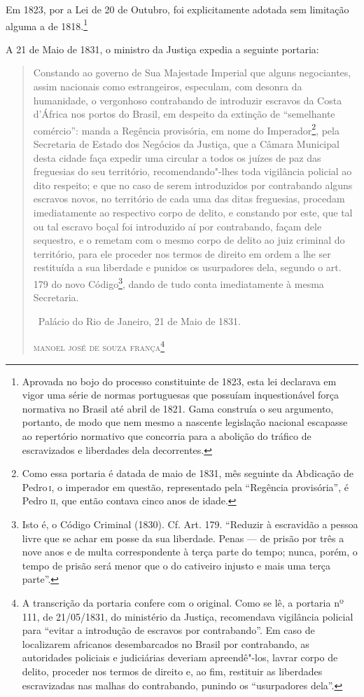 Em 1823, por a Lei de 20 de Outubro, foi explicitamente adotada sem
limitação alguma a de 1818.\footnote{Aprovada no bojo do processo
  constituinte de 1823, esta lei declarava em vigor uma série de normas
  portuguesas que possuíam inquestionável força normativa no Brasil até
  abril de 1821. Gama construía o seu argumento, portanto, de modo que
  nem mesmo a nascente legislação nacional escapasse ao repertório
  normativo que concorria para a abolição do tráfico de escravizados e
  liberdades dela decorrentes.}

A 21 de Maio de 1831, o ministro da Justiça expedia a seguinte portaria:

\begin{quote}
Constando ao governo de Sua Majestade Imperial que alguns negociantes,
assim nacionais como estrangeiros, especulam, com desonra da humanidade,
o vergonhoso contrabando de introduzir escravos da Costa d'África nos
portos do Brasil, em despeito da extinção de ``semelhante comércio'':
manda a Regência provisória, em nome do Imperador\footnote{Como essa
  portaria é datada de maio de 1831, mês seguinte da Abdicação de Pedro\,\textsc{i}, o imperador em questão, representado pela ``Regência provisória'', é
  Pedro \textsc{ii}, que então contava cinco anos de idade.}, pela Secretaria de
Estado dos Negócios da Justiça, que a Câmara Municipal desta cidade faça
expedir uma circular a todos os juízes de paz das freguesias do seu
território, recomendando"-lhes toda vigilância policial ao dito respeito;
e que no caso de serem introduzidos por contrabando alguns escravos
novos, no território de cada uma das ditas freguesias, procedam
imediatamente ao respectivo corpo de delito, e constando por este, que
tal ou tal escravo boçal foi introduzido aí por contrabando, façam dele
sequestro, e o remetam com o mesmo corpo de delito ao juiz criminal do
território, para ele proceder nos termos de direito em ordem a lhe ser
restituída a sua liberdade e punidos os usurpadores dela, segundo o art.
179 do novo Código\footnote{Isto é, o Código Criminal (1830). Cf. Art.
  179. ``Reduzir à escravidão a pessoa livre que se achar em posse da sua
  liberdade. Penas --- de prisão por três a nove anos e de multa
  correspondente à terça parte do tempo; nunca, porém, o tempo de prisão
  será menor que o do cativeiro injusto e mais uma terça parte''.}, dando
de tudo conta imediatamente à mesma Secretaria.

\bigskip

\hfill\ Palácio do Rio de Janeiro, 21 de Maio de 1831.\smallskip

\hfill\textsc{manoel josé de souza frança}\footnote{A transcrição da portaria
  confere com o original. Como se lê, a portaria nº 111, de 21/05/1831,
  do ministério da Justiça, recomendava vigilância policial para ``evitar
  a introdução de escravos por contrabando''. Em caso de localizarem
  africanos desembarcados no Brasil por contrabando, as autoridades
  policiais e judiciárias deveriam apreendê"-los, lavrar corpo de
  delito, proceder nos termos de direito e, ao fim, restituir as
  liberdades escravizadas nas malhas do contrabando, punindo os
  ``usurpadores dela''.}
\end{quote}

